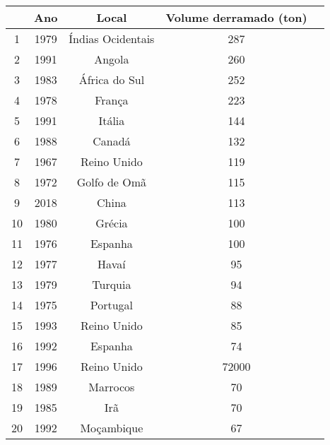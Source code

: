 \begin{table}[!htbp]
\centering
\begin{tabular}{|c|c|c|c|l|}
\hline
   & Ano  & Local               & Volume   derramado (ton) &  \\ \hline
1  & 1979 & Índias   Ocidentais & 287                      &  \\ \hline
2  & 1991 & Angola              & 260                      &  \\ \hline
3  & 1983 & África   do Sul     & 252                      &  \\ \hline
4  & 1978 & França              & 223                      &  \\ \hline
5  & 1991 & Itália              & 144                      &  \\ \hline
6  & 1988 & Canadá              & 132                      &  \\ \hline
7  & 1967 & Reino   Unido       & 119                      &  \\ \hline
8  & 1972 & Golfo   de Omã      & 115                      &  \\ \hline
9  & 2018 & China               & 113                      &  \\ \hline
10 & 1980 & Grécia              & 100                      &  \\ \hline
11 & 1976 & Espanha             & 100                      &  \\ \hline
12 & 1977 & Havaí               & 95                       &  \\ \hline
13 & 1979 & Turquia             & 94                       &  \\ \hline
14 & 1975 & Portugal            & 88                       &  \\ \hline
15 & 1993 & Reino   Unido       & 85                       &  \\ \hline
16 & 1992 & Espanha             & 74                       &  \\ \hline
17 & 1996 & Reino   Unido       & 72000                    &  \\ \hline
18 & 1989 & Marrocos            & 70                       &  \\ \hline
19 & 1985 & Irã                 & 70                       &  \\ \hline
20 & 1992 & Moçambique          & 67                       &  \\ \hline
\end{tabular}
\end{table}